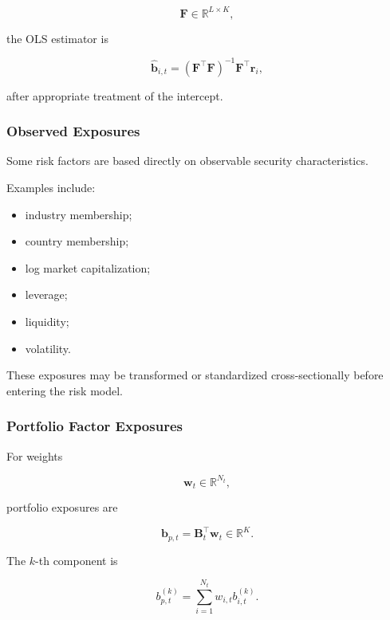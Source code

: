 \documentclass[11pt,a4paper]{article}
\begin{document}
\begin{equation}
\mathbf{F}
\in
\mathbb{R}^{L\times K},
\end{equation}

the OLS estimator is

\begin{equation}
\boxed{
\widehat{\mathbf{b}}_{i,t}
=
\left(
\mathbf{F}^\top
\mathbf{F}
\right)^{-1}
\mathbf{F}^\top
\mathbf{r}_i,
}
\end{equation}

after appropriate treatment of the intercept.


\subsubsection{Observed Exposures}

Some risk factors are based directly on observable security characteristics.

Examples include:

\begin{itemize}
    \item industry membership;
    \item country membership;
    \item log market capitalization;
    \item leverage;
    \item liquidity;
    \item volatility.
\end{itemize}

These exposures may be transformed or standardized cross-sectionally before
entering the risk model.


\subsubsection{Portfolio Factor Exposures}

For weights

\begin{equation}
\mathbf{w}_t
\in
\mathbb{R}^{N_t},
\end{equation}

portfolio exposures are

\begin{equation}
\boxed{
\mathbf{b}_{p,t}
=
\mathbf{B}_t^\top
\mathbf{w}_t
\in
\mathbb{R}^{K}.
}
\end{equation}

The $k$-th component is

\begin{equation}
b_{p,t}^{(k)}
=
\sum_{i=1}^{N_t}
w_{i,t}
b_{i,t}^{(k)}.
\end{equation}
\end{document}
